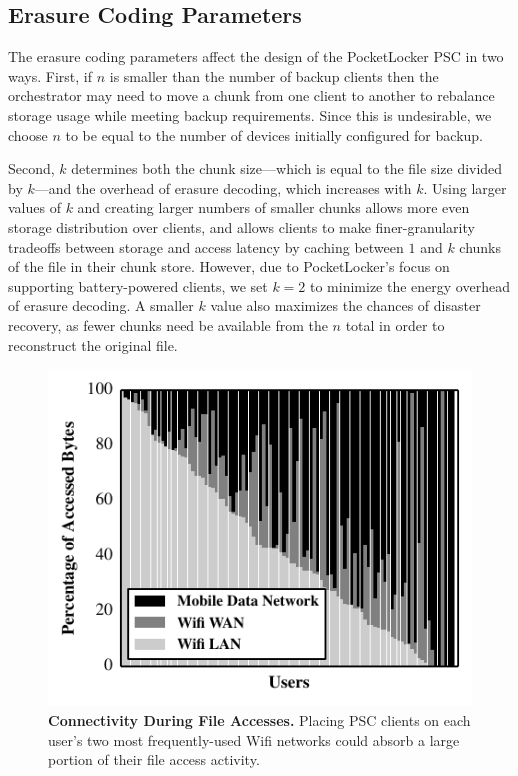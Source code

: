 \subsection{Erasure Coding Parameters}

The erasure coding parameters affect the design of the PocketLocker PSC in
two ways. First, if $n$ is smaller than the number of backup clients then the
orchestrator may need to move a chunk from one client to another to rebalance
storage usage while meeting backup requirements. Since this is undesirable,
we choose $n$ to be equal to the number of devices initially configured for
backup.

Second, $k$ determines both the chunk size---which is equal to the file size
divided by $k$---and the overhead of erasure decoding, which increases with
$k$. Using larger values of $k$ and creating larger numbers of smaller chunks
allows more even storage distribution over clients, and allows clients to
make finer-granularity tradeoffs between storage and access latency by
caching between $1$ and $k$ chunks of the file in their chunk store. However,
due to PocketLocker's focus on supporting battery-powered clients, we set $k
= 2$ to minimize the energy overhead of erasure decoding. A smaller $k$ value
also maximizes the chances of disaster recovery, as fewer chunks need be
available from the $n$ total in order to reconstruct the original file.

\begin{figure}[t]

  \includegraphics{./figures/pocketlocker/ConnectivityPercentageGraph.pdf}

  \caption{\small \textbf{Connectivity During File Accesses.} Placing PSC
    clients on each user's two most frequently-used Wifi networks could absorb a
  large portion of their file access activity.}

  \label{fig-simulation-connectivity}
  
  \vspace*{-0.2in}
\end{figure}
